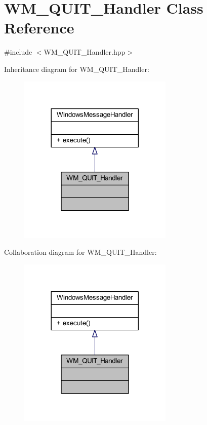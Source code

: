\hypertarget{class_w_m___q_u_i_t___handler}{}\section{W\+M\+\_\+\+Q\+U\+I\+T\+\_\+\+Handler Class Reference}
\label{class_w_m___q_u_i_t___handler}


{\ttfamily \#include $<$W\+M\+\_\+\+Q\+U\+I\+T\+\_\+\+Handler.\+hpp$>$}



Inheritance diagram for W\+M\+\_\+\+Q\+U\+I\+T\+\_\+\+Handler\+:\nopagebreak
\begin{figure}[H]
\begin{center}
\leavevmode
\includegraphics[width=209pt]{class_w_m___q_u_i_t___handler__inherit__graph}
\end{center}
\end{figure}


Collaboration diagram for W\+M\+\_\+\+Q\+U\+I\+T\+\_\+\+Handler\+:\nopagebreak
\begin{figure}[H]
\begin{center}
\leavevmode
\includegraphics[width=209pt]{class_w_m___q_u_i_t___handler__coll__graph}
\end{center}
\end{figure}
